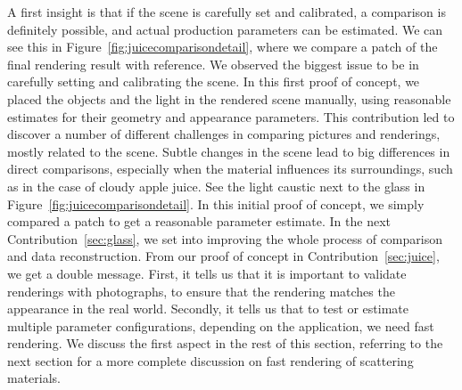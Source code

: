 A first insight is that if the scene is carefully set and calibrated, a comparison is definitely possible, and actual production parameters can be estimated. We can see this in Figure~\ref{fig:juicecomparisondetail}, where we compare a patch of the final rendering result with reference. We observed the biggest issue to be in carefully setting and calibrating the scene. In this first proof of concept, we placed the objects and the light in the rendered scene manually, using reasonable estimates for their geometry and appearance parameters. This contribution led to discover a number of different challenges in comparing pictures and renderings, mostly related to the scene. Subtle changes in the scene lead to big differences in direct comparisons, especially when the material influences its surroundings, such as in the case of cloudy apple juice. See the light caustic next to the glass in Figure~\ref{fig:juicecomparisondetail}. In this initial proof of concept, we simply compared a patch to get a reasonable parameter estimate. In the next Contribution~\ref{sec:glass}, we set into improving the whole process of comparison and data reconstruction. From our proof of concept in Contribution~\ref{sec:juice}, we get a double message. First, it tells us that it is important to validate renderings with photographs, to ensure that the rendering matches the appearance in the real world. Secondly, it tells us that to test or estimate multiple parameter configurations, depending on the application, we need fast rendering. We discuss the first aspect in the rest of this section, referring to the next section for a more complete discussion on fast rendering of scattering materials. 

